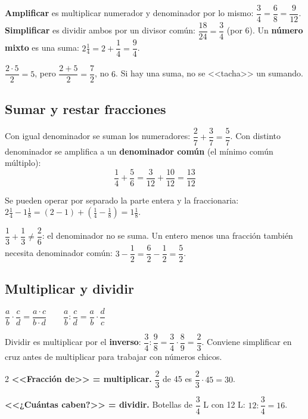 \textbf{Amplificar} es multiplicar numerador y denominador por lo mismo: $\dfrac{3}{4} = \dfrac{6}{8} = \dfrac{9}{12}$. \textbf{Simplificar} es dividir ambos por un divisor común: $\dfrac{18}{24} = \dfrac{3}{4}$ (por 6). Un \textbf{número mixto} es una suma: $2\tfrac{1}{4} = 2 + \dfrac{1}{4} = \dfrac{9}{4}$.
\begin{ojo} $\dfrac{2\cdot 5}{2} = 5$, pero $\dfrac{2 + 5}{2} = \dfrac{7}{2}$, no $6$. Si hay una suma, no se <<tacha>> un sumando.\end{ojo}

\subsection{Sumar y restar fracciones}
Con igual denominador se suman los numeradores: $\dfrac{2}{7} + \dfrac{3}{7} = \dfrac{5}{7}$. Con distinto denominador se amplifica a un \textbf{denominador común} (el mínimo común múltiplo):
\[ \frac{1}{4} + \frac{5}{6} = \frac{3}{12} + \frac{10}{12} = \frac{13}{12} \]
\begin{ejemplo} Se pueden operar por separado la parte entera y la fraccionaria: $2\tfrac{1}{4} - 1\tfrac{1}{8} = (2 - 1) + \left(\tfrac{1}{4} - \tfrac{1}{8}\right) = 1\tfrac{1}{8}$.\end{ejemplo}
\begin{ojo}[Nunca] $\dfrac{1}{3} + \dfrac{1}{3} \neq \dfrac{2}{6}$: el denominador no se suma. Un entero menos una fracción también necesita denominador común: $3 - \dfrac{1}{2} = \dfrac{6}{2} - \dfrac{1}{2} = \dfrac{5}{2}$.\end{ojo}

\subsection{Multiplicar y dividir}
\begin{clave}[Reglas] $\dfrac{a}{b}\cdot\dfrac{c}{d} = \dfrac{a\cdot c}{b\cdot d} \qquad \dfrac{a}{b} : \dfrac{c}{d} = \dfrac{a}{b}\cdot\dfrac{d}{c}$\end{clave}
Dividir es multiplicar por el \textbf{inverso}: $\dfrac{3}{4} : \dfrac{9}{8} = \dfrac{3}{4}\cdot\dfrac{8}{9} = \dfrac{2}{3}$. Conviene simplificar en cruz antes de multiplicar para trabajar con números chicos.

\begin{multicols}{2}
\textbf{<<Fracción de>> = multiplicar.} $\dfrac{2}{3}$ de 45 es $\dfrac{2}{3}\cdot 45 = 30$.

\columnbreak
\textbf{<<¿Cuántas caben?>> = dividir.} Botellas de $\dfrac{3}{4}$ L con 12 L: $12 : \dfrac{3}{4} = 16$.
\end{multicols}

